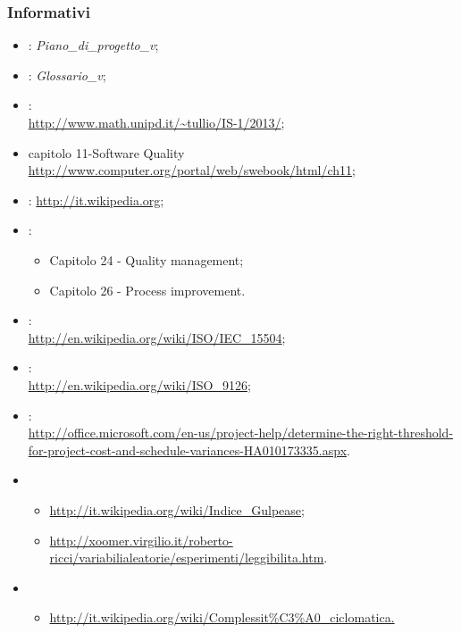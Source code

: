 \subsubsection{Informativi}
\label{1.4.2}
\begin{itemize}
\item {}:  \emph{Piano\_di\_progetto\_v\versionePianoDiProgetto{}};\\
\item {}: \emph{Glossario\_v\versioneGlossario{}};\\
\item {}:
\\ \url{http://www.math.unipd.it/~tullio/IS-1/2013/};
\item {} capitolo 11-Software Quality \\ \url{http://www.computer.org/portal/web/swebook/html/ch11};
\item {}: \url{http://it.wikipedia.org};
\item {}:
\begin{itemize}
\item Capitolo 24 - Quality management;
\item Capitolo 26 - Process improvement.
\end{itemize}
\item {}:
\\ \url{http://en.wikipedia.org/wiki/ISO/IEC_15504};
\item {}:
\\ \url{http://en.wikipedia.org/wiki/ISO_9126};
\item {}: \\ \url{http://office.microsoft.com/en-us/project-help/determine-the-right-threshold-for-project-cost-and-schedule-variances-HA010173335.aspx}.
\item {}
\begin{itemize}
\item \url{http://it.wikipedia.org/wiki/Indice_Gulpease};
\item \url{http://xoomer.virgilio.it/roberto-ricci/variabilialeatorie/esperimenti/leggibilita.htm}.
\end{itemize}
\item {}
\begin{itemize}
\item \url{http://it.wikipedia.org/wiki/Complessit%C3%A0_ciclomatica.}
\end{itemize}
\end{itemize}


